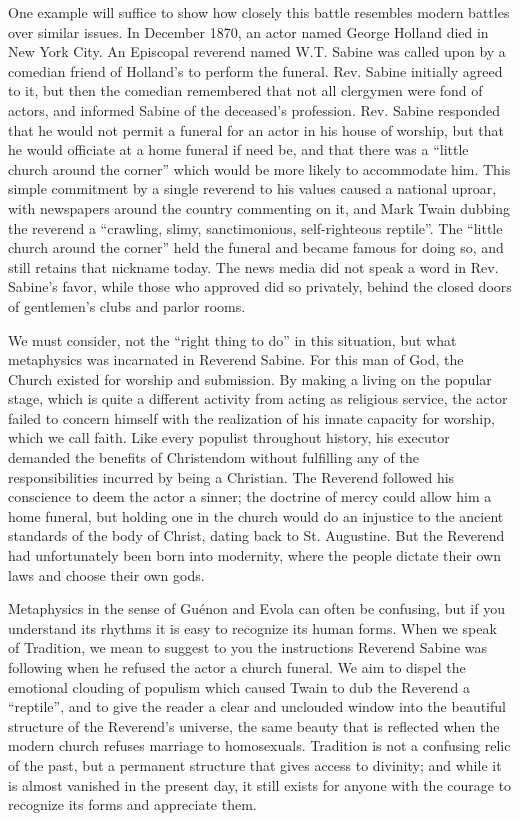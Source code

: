 One example will suffice to show how closely this battle resembles modern battles over similar issues. In December 1870, an actor named George Holland died in New York City. An Episcopal reverend named W.T. Sabine was called upon by a comedian friend of Holland's to perform the funeral. Rev. Sabine initially agreed to it, but then the comedian remembered that not all clergymen were fond of actors, and informed Sabine of the deceased's profession. Rev. Sabine responded that he would not permit a funeral for an actor in his house of worship, but that he would officiate at a home funeral if need be, and that there was a ``little church around the corner'' which would be more likely to accommodate him. This simple commitment by a single reverend to his values caused a national uproar, with newspapers around the country commenting on it, and Mark Twain dubbing the reverend a ``crawling, slimy, sanctimonious, self-righteous reptile''. The ``little church around the corner'' held the funeral and became famous for doing so, and still retains that nickname today. The news media did not speak a word in Rev. Sabine's favor, while those who approved did so privately, behind the closed doors of gentlemen's clubs and parlor rooms.

We must consider, not the ``right thing to do'' in this situation, but what metaphysics was incarnated in Reverend Sabine. For this man of God, the Church existed for worship and submission. By making a living on the popular stage, which is quite a different activity from acting as religious service, the actor failed to concern himself with the realization of his innate capacity for worship, which we call faith. Like every populist throughout history, his executor demanded the benefits of Christendom without fulfilling any of the responsibilities incurred by being a Christian. The Reverend followed his conscience to deem the actor a sinner; the doctrine of mercy could allow him a home funeral, but holding one in the church would do an injustice to the ancient standards of the body of Christ, dating back to St. Augustine. But the Reverend had unfortunately been born into modernity, where the people dictate their own laws and choose their own gods.

Metaphysics in the sense of Guénon and Evola can often be confusing, but if you understand its rhythms it is easy to recognize its human forms. When we speak of Tradition, we mean to suggest to you the instructions Reverend Sabine was following when he refused the actor a church funeral. We aim to dispel the emotional clouding of populism which caused Twain to dub the Reverend a ``reptile'', and to give the reader a clear and unclouded window into the beautiful structure of the Reverend's universe, the same beauty that is reflected when the modern church refuses marriage to homosexuals. Tradition is not a confusing relic of the past, but a permanent structure that gives access to divinity; and while it is almost vanished in the present day, it still exists for anyone with the courage to recognize its forms and appreciate them.

